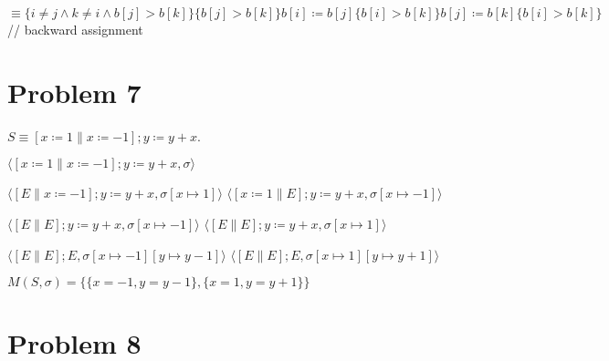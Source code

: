 \documentclass{article}
\begin{document}
\qquad \qquad $ \equiv \{i \neq j \wedge k \neq i \wedge b[j]> b[k]\}\{b[j] > b[k]\}b[i] \coloneqq b[j]\{b[i] > b[k]\}b[j] \coloneqq b[k] \{b[i] > b[k]\}$ 
\qquad // backward assignment

\section*{Problem 7}

$ S \equiv [x \coloneqq 1 \parallel x \coloneqq -1]; y \coloneqq y+x $.
\vspace{10pt}
\vspace{10pt}

\qquad \qquad \qquad \qquad \qquad \qquad $ \langle [x \coloneqq 1 \parallel x \coloneqq -1]; y \coloneqq y+x, \sigma \rangle $
\vspace{10pt}
\vspace{10pt}

$ \langle [E \parallel x \coloneqq -1]; y \coloneqq y+x, \sigma[x \mapsto 1] \rangle $  \qquad \qquad $ \langle [x \coloneqq 1 \parallel E]; y \coloneqq y+x, \sigma[x \mapsto -1] \rangle $

\vspace{10pt}
\vspace{10pt}
$ \langle [E \parallel E]; y \coloneqq y+x, \sigma[x \mapsto -1] \rangle $ \qquad \qquad \qquad $ \langle [E \parallel E]; y \coloneqq y+x, \sigma[x \mapsto 1] \rangle $

\vspace{10pt}
\vspace{10pt}
$ \langle [E \parallel E]; E, \sigma[x \mapsto -1][y \mapsto y-1] \rangle $ \qquad \qquad $ \langle [E \parallel E]; E, \sigma[x \mapsto 1][y \mapsto y+1] \rangle $

\vspace{10pt}
$ M(S, \sigma) = \{\{x = -1,y = y-1\},\{x = 1,y = y+1\}\} $

\vspace{10pt}
\vspace{10pt}
\vspace{10pt}
\vspace{10pt}
\vspace{10pt}
\vspace{10pt}
\vspace{10pt}
\vspace{10pt}
\section*{Problem 8}
\end{document}
